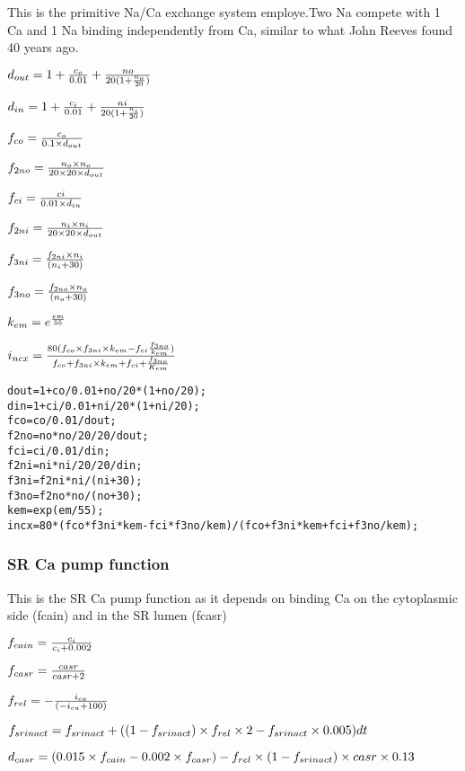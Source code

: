 \documentclass[11pt]{article}
\begin{document}
This is the primitive Na/Ca exchange system employe.Two Na compete with
1 Ca and 1 Na binding independently from Ca, similar to what John Reeves
found 40 years ago.

    \(\large d_{out} = 1+ \frac{c_o}{0.01}+ \frac{no}{20(1+\frac{n_o}{20})}\)

\(\large d_{in} = 1+ \frac{c_i}{0.01}+ \frac{ni}{20(1+\frac{n_i}{20})}\)

\(\large f_{co} = \frac{c_o}{0.1 \times d_{out}}\)

\(\large f_{2no} = \frac{n_o \times n_o}{20 \times 20 \times d_{out}}\)

\(\large f_{ci} = \frac{ci}{0.01 \times d_{in}}\)

\(\large f_{2ni} = \frac{n_i \times n_i}{20 \times 20 \times d_{out}}\)

\(\large f_{3ni} = \frac{f_{2ni} \times n_i}{(n_i+30)}\)

\(\large f_{3no} = \frac{f_{2no} \times n_o}{(n_o+30)}\)

\(\large k_{em} = e^\frac{em}{55}\)

\(\large i_{ncx} = \frac{80(f_{co} \times f_{3ni} \times k_{em} - f_{ci}\frac{f_{3no}}{k_{em}})}{f_{co}+f_{3ni} \times k_{em}+f_{ci}+\frac{f_{3no}}{K_{em}}}\)

    \begin{verbatim}
dout=1+co/0.01+no/20*(1+no/20);
din=1+ci/0.01+ni/20*(1+ni/20);
fco=co/0.01/dout;
f2no=no*no/20/20/dout;
fci=ci/0.01/din;
f2ni=ni*ni/20/20/din;
f3ni=f2ni*ni/(ni+30);
f3no=f2no*no/(no+30);
kem=exp(em/55);
incx=80*(fco*f3ni*kem-fci*f3no/kem)/(fco+f3ni*kem+fci+f3no/kem);
\end{verbatim}

    \subsubsection{SR Ca pump function}\label{sr-ca-pump-function}

This is the SR Ca pump function as it depends on binding Ca on the
cytoplasmic side (fcain) and in the SR lumen (fcasr)

    \(\large f_{cain} = \frac{c_i}{c_i+0.002}\)

\(\large f_{casr} = \frac{casr}{casr+2}\)

\(\large f_{rel} = -\frac{i_{ca}}{(-i_{ca}+100)}\)

\(\large f_{srinact} = f_{srinact}+((1-f_{srinact}) \times f_{rel} \times 2-f_{srinact} \times 0.005)dt\)

\(\large d_{casr} = (0.015 \times f_{cain}-0.002 \times f_{casr})-f_{rel}\times (1-f_{srinact}) \times casr \times 0.13\)
\end{document}
